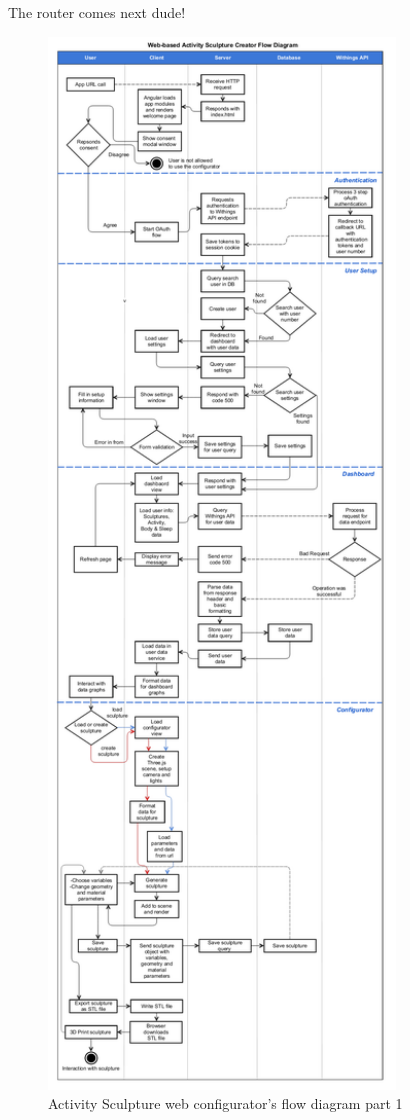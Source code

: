 \documentclass[../medieninformatik-arbeit.tex]{subfiles}
\begin{document}
The router comes next dude!


\begin{figure}[hb!]
\captionsetup{width=\textwidth}
\begin{center}
  \includegraphics[width=0.82\textwidth]{Configurator/img/flow_diagram_1}
  \caption{Activity Sculpture web configurator's flow diagram part 1}
\label{fig:flowdiagram1}
\end{center}
\end{figure}
\end{document}
